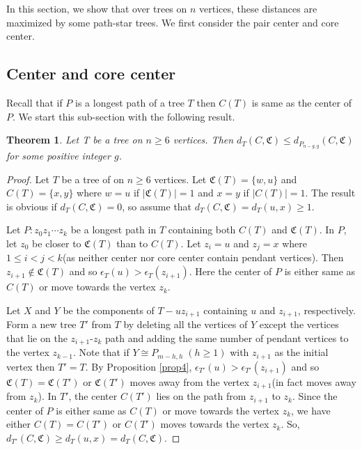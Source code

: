 \documentclass[10pt,a4paper]{amsart}
\newtheorem{theorem}{Theorem}[section]
\begin{document}
In this section, we show that over trees on $n$ vertices, these distances are maximized by some path-star trees. We first consider the pair center and core center.

\subsection{Center and core center}

Recall that if $P$ is a longest path of a tree $T$ then $C(T)$ is same as the center of $P$. We start this sub-section with the following result.
\begin{theorem}\label{thm:cc1}
Let T be a tree on $n\geq 6$ vertices. Then  $d_T(C,\mathfrak{C})\leq d_{P_{n-g,g}}(C,\mathfrak{C})$ for some positive integer $g$.
\end{theorem}
\begin{proof}
Let $T$ be a tree of on $n\geq 6$ vertices. Let $\mathfrak{C}(T)=\{w,u\}$ and $C(T)=\{x,y\}$ where $w=u$ if $|\mathfrak{C}(T)|=1$ and $x=y$ if $|C(T)|=1$.  The result is obvious if $d_T(C,\mathfrak{C})=0$, so assume that  $d_T(C,\mathfrak{C})=d_T(u,x)\geq 1$.

Let $P:z_0z_1 \cdots z_k$ be a longest path in $T$ containing both $C(T)$ and $\mathfrak{C}(T)$. In $P$, let $z_0$ be closer to $\mathfrak{C}(T)$ than to $C(T)$. Let $z_i=u$ and $z_j=x$ where $1\leq i<j<k$(as neither center nor core center contain pendant vertices). Then $z_{i+1}\notin \mathfrak{C}(T)$ and so  $\epsilon_T(u)>\epsilon_T(z_{i+1})$. Here the center of $P$ is either same as $C(T)$ or move towards the vertex $z_k$.

Let $X$ and $Y$ be the components of $T-uz_{i+1}$ containing $u$ and $z_{i+1}$, respectively. Form  a new tree $T'$ from $T$ by deleting all the vertices of $Y$ except the vertices that lie on the $z_{i+1}$-$z_k$ path and adding the same number of pendant vertices to the vertex $z_{k-1}$. Note that if $Y\cong P_{m-h,h}\;(h\geq 1)$ with $z_{i+1}$ as the initial vertex then $T'=T.$ By Proposition \ref{prop4}, $\epsilon_{T'}(u)>\epsilon_{T'}(z_{i+1})$ and so $\mathfrak{C}(T)=\mathfrak{C}(T')$ or $\mathfrak{C}(T')$ moves away from the vertex $z_{i+1}$(in fact moves away from $z_k$). In $T'$, the center $C(T')$ lies on the path from $z_{i+1}$ to $z_k$. Since the center of $P$ is either same as $C(T)$ or move towards the vertex $z_k$, we have  either $C(T)=C(T')$ or $C(T')$ moves towards the vertex $z_k$. So, $d_{T'}(C,\mathfrak{C})\geq d_T(u,x)=d_T(C,\mathfrak{C})$.


\end{proof}
\end{document}
